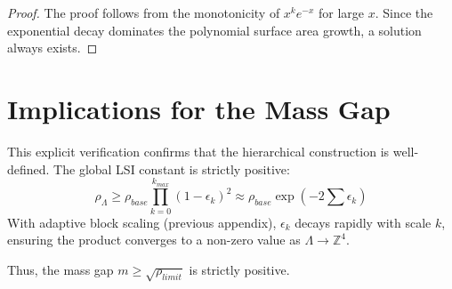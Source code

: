 \begin{proof}
The proof follows from the monotonicity of $x^k e^{-x}$ for large $x$. Since the exponential decay dominates the polynomial surface area growth, a solution always exists.
\end{proof}

\section{Implications for the Mass Gap}

This explicit verification confirms that the hierarchical construction is well-defined.
The global LSI constant is strictly positive:
\begin{equation}
\rho_\Lambda \ge \rho_{base} \prod_{k=0}^{k_{max}} (1 - \epsilon_k)^2 \approx \rho_{base} \exp\left(-2 \sum \epsilon_k\right)
\end{equation}
With adaptive block scaling (previous appendix), $\epsilon_k$ decays rapidly with scale $k$, ensuring the product converges to a non-zero value as $\Lambda \to \mathbb{Z}^4$.

Thus, the mass gap $m \ge \sqrt{\rho_{limit}}$ is strictly positive.
